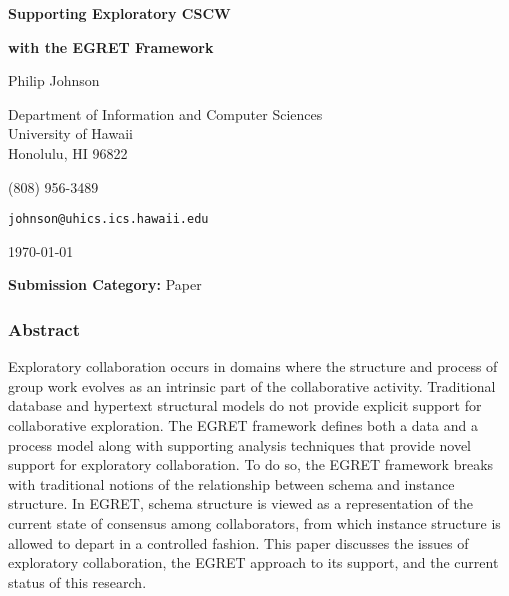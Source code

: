 



\begin{titlepage}

\vspace*{1in}
\begin{center}

{\Large\bf Supporting Exploratory CSCW} \medskip\par
{\Large\bf with the EGRET Framework}\bigskip\par

{\large Philip Johnson}

Department of Information and Computer Sciences\\ 
University of Hawaii\\ 
Honolulu, HI 96822 \medskip\par

(808) 956-3489\medskip\par
{\tt johnson@uhics.ics.hawaii.edu}\medskip\par
\today \bigskip\par
{\bf Submission Category:} Paper
\end{center}
\end{titlepage}

\subsubsection*{Abstract}
  
Exploratory collaboration occurs in domains where the structure and process of group work evolves as an intrinsic part of the collaborative activity.  Traditional database and hypertext structural models do not provide explicit support for collaborative exploration.  The EGRET framework defines both a data and a process model along with supporting analysis techniques that provide novel support for exploratory collaboration.  To do so, the EGRET framework breaks with traditional notions of the relationship between schema and instance structure.  In EGRET, schema structure is viewed as a representation of the current state of consensus among collaborators, from which instance structure is allowed to depart in a controlled fashion.  This paper discusses the issues of exploratory collaboration, the EGRET approach to its support, and the current status of this research.

